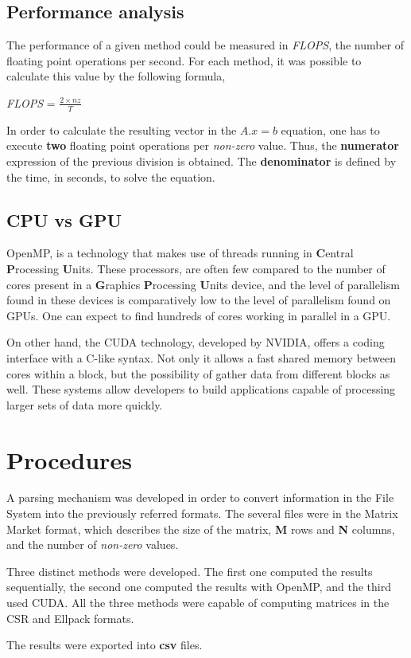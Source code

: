 \documentclass[12pt]{article}
\begin{document}
\subsection*{Performance analysis}

\par The performance of a given method could be measured in \textit{FLOPS}, the number of floating point operations per second. For each method, it was possible to calculate this value by the following formula,

\begin{center}
\large
\textit{FLOPS} = 
\huge
$
\frac{2 \times nz}{T}
$
\end{center}

\par In order to calculate the resulting vector in the $A.x = b$ equation, one has to execute \textbf{two} floating point operations per \textit{non-zero} value. Thus, the \textbf{numerator} expression of the previous division is obtained. The \textbf{denominator} is defined by the time, in seconds, to solve the equation. 

\subsection*{CPU vs GPU}
OpenMP, is a technology that makes use of threads running in \textbf{C}entral \textbf{P}rocessing \textbf{U}nits. These processors, are often few compared to the number of cores present in a \textbf{G}raphics \textbf{P}rocessing \textbf{U}nits device, and the level of parallelism found in these devices is comparatively low to the level of parallelism found on GPUs. One can expect to find hundreds of cores working in parallel in a GPU. 
\par On other hand, the CUDA technology, developed by NVIDIA, offers a coding interface with a C-like syntax. Not only it allows a fast shared memory between cores within a block, but the possibility of gather data from different blocks as well. These systems allow developers to build applications capable of processing larger sets of data more quickly.\cite{cpu-gpu} 


\section*{Procedures}
\par A parsing mechanism was developed in order to convert information in the File System into the previously referred formats. The several files were in the Matrix Market format, which describes the size of the matrix, \textbf{M} rows and \textbf{N} columns, and the number of \textit{non-zero} values. 
\par Three distinct methods were developed. The first one computed the results sequentially, the second one computed the results with OpenMP, and the third used CUDA. All the three methods were capable of computing matrices in the CSR and Ellpack formats. 
\par The results were exported into \textbf{csv} files.
\end{document}
